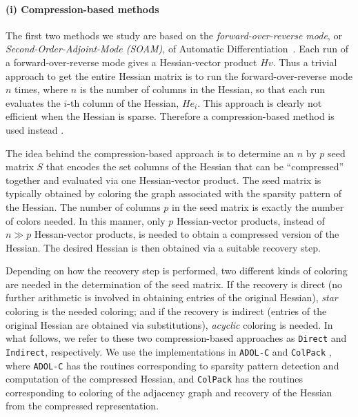 \documentclass[11pt, a4paper, english]{article}
\begin{document}
\paragraph{(i) Compression-based methods}
The first two methods we study are based on the {\em forward-over-reverse mode}, or {\em Second-Order-Adjoint-Mode (SOAM)}, of Automatic Differentiation~\cite{griewank2008evaluating, naumann2012art}. Each run of a forward-over-reverse mode gives a Hessian-vector product $Hv$. Thus a trivial approach to get the entire Hessian matrix is to run the forward-over-reverse mode $n$ times, where $n$ is the number of columns in the Hessian, so that each run evaluates the $i$-th column of the Hessian, $He_i$. This approach is clearly not efficient  when the Hessian is sparse.  Therefore a compression-based method is used instead \cite{gebremedhin2009efficient}. 

The idea behind the compression-based approach is to determine an $n$ by $p$ seed matrix $S$
that encodes the set columns of the Hessian that can be ``compressed'' together and evaluated via one Hessian-vector product. The seed matrix is typically obtained by
coloring the graph associated with the sparsity pattern of the Hessian. 
The number of columns $p$ in the seed matrix is exactly the number of colors needed. 
In this manner, only $p$ Hessian-vector products, instead of $n \gg p$ Hessan-vector products, is needed to obtain a compressed version of the Hessian. The desired Hessian is then obtained via a suitable recovery step.  

Depending on how the recovery step is performed, two different kinds of coloring are needed in the determination of the seed matrix. If the recovery is direct (no further arithmetic is involved in obtaining entries of the original Hessian),  {\em star} coloring is the needed coloring;
and if the recovery is indirect (entries of the original Hessian are obtained via substitutions), {\em acyclic} coloring is needed. In what follows, we refer to these two compression-based approaches  as {\tt Direct} and {\tt Indirect}, respectively. We use the implementations in {\tt ADOL-C} \cite{walther2009getting} and {\tt ColPack} \cite{gebremedhin2013colpack}, where {\tt ADOL-C} has the routines corresponding to sparsity pattern detection and computation of the compressed Hessian, and {\tt ColPack} has the routines  corresponding to coloring of the adjacency graph and recovery of the Hessian from the compressed representation.
\end{document}
